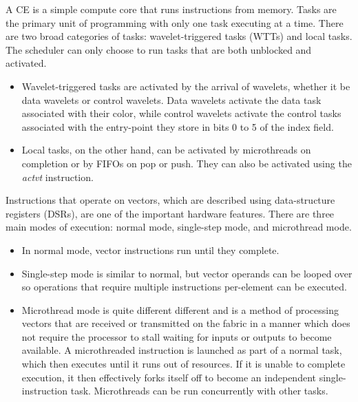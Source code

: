 A CE is a simple compute core that runs instructions from memory.
%
Tasks are the primary unit of programming with only one task executing at a time.
%
There are two broad categories of tasks: wavelet-triggered tasks (WTTs) and local tasks. 
%
The scheduler can only choose to run tasks that are both unblocked and activated.
\begin{itemize}
  \item Wavelet-triggered tasks are activated by the arrival of wavelets, whether it be data wavelets or control 
  wavelets.
  Data wavelets activate the data task associated with their color, while control wavelets activate the control tasks associated with the entry-point they store in bits 0 to 5 of the index field.
  \item Local tasks, on the other hand, can be activated by microthreads on completion or by FIFOs on pop or push.
  They can also be activated using the {\it actvt} instruction.
\end{itemize}
%
Instructions that operate on vectors, which are described using data-structure registers (DSRs), are one of the important hardware features.
%
There are three main modes of execution: normal mode, single-step mode, and microthread mode.
\begin{itemize}
  \item In normal mode, vector instructions run until they complete.
  \item Single-step mode is similar to normal, but vector operands can be looped over so operations that require multiple instructions per-element can be executed.
  \item Microthread mode is quite different different and is a method of processing vectors that are received or transmitted on the fabric in a manner which does not require the processor to stall waiting for inputs or outputs to become available.
  A microthreaded instruction is launched as part of a normal task, which then executes until it runs out of resources.
  If it is unable to complete execution, it then effectively forks itself off to become an independent single-instruction task. 
  Microthreads can be run concurrently with other tasks.
\end{itemize}

